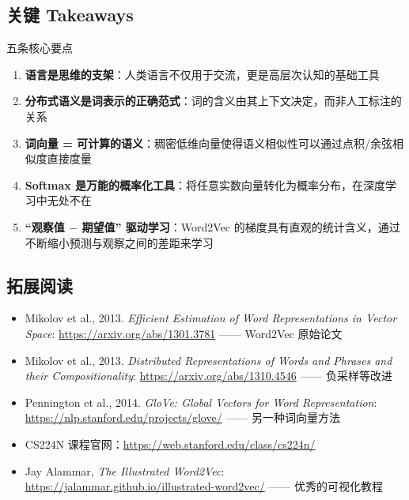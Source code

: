 \documentclass[a4paper]{article}
\begin{document}
\subsection{关键 Takeaways}

\begin{importantbox}{五条核心要点}
\begin{enumerate}
    \item \textbf{语言是思维的支架}：人类语言不仅用于交流，更是高层次认知的基础工具
    \item \textbf{分布式语义是词表示的正确范式}：词的含义由其上下文决定，而非人工标注的关系
    \item \textbf{词向量 = 可计算的语义}：稠密低维向量使得语义相似性可以通过点积/余弦相似度直接度量
    \item \textbf{Softmax 是万能的概率化工具}：将任意实数向量转化为概率分布，在深度学习中无处不在
    \item \textbf{``观察值 $-$ 期望值'' 驱动学习}：Word2Vec 的梯度具有直观的统计含义，通过不断缩小预测与观察之间的差距来学习
\end{enumerate}
\end{importantbox}

\subsection{拓展阅读}

\begin{itemize}
    \item Mikolov et al., 2013. \textit{Efficient Estimation of Word Representations in Vector Space}: \url{https://arxiv.org/abs/1301.3781} —— Word2Vec 原始论文
    \item Mikolov et al., 2013. \textit{Distributed Representations of Words and Phrases and their Compositionality}: \url{https://arxiv.org/abs/1310.4546} —— 负采样等改进
    \item Pennington et al., 2014. \textit{GloVe: Global Vectors for Word Representation}: \url{https://nlp.stanford.edu/projects/glove/} —— 另一种词向量方法
    \item CS224N 课程官网：\url{https://web.stanford.edu/class/cs224n/}
    \item Jay Alammar, \textit{The Illustrated Word2Vec}: \url{https://jalammar.github.io/illustrated-word2vec/} —— 优秀的可视化教程
\end{itemize}
\end{document}
